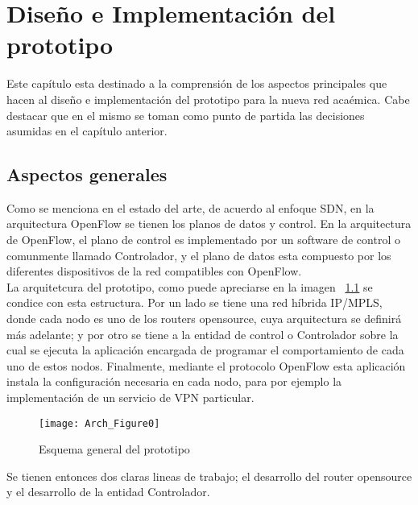 \chapter{Dise\~no e Implementaci\'on del prototipo}

\ifpdf
    \graphicspath{{Chapter4/Figs/Raster/}{Chapter4/Figs/PDF/}{Chapter4/Figs/}}
\else
    \graphicspath{{Chapter4/Figs/Vector/}{Chapter4/Figs/}}
\fi

Este cap\'itulo esta destinado a la comprensi\'on de los aspectos principales que hacen al dise\~no e implementaci\'on del prototipo para la nueva red aca\'emica. Cabe destacar que en el mismo se toman como punto de partida las decisiones asumidas en el cap\'itulo anterior.

\section{Aspectos generales}

Como se menciona en el estado del arte, de acuerdo al enfoque SDN, en la arquitectura OpenFlow se tienen los planos de datos y control. En la arquitectura de OpenFlow, el plano de control es implementado por un software de control o comunmente llamado Controlador, y el plano de datos esta compuesto por los diferentes dispositivos de la red compatibles con OpenFlow.\\

La arquitetcura del prototipo, como puede apreciarse en la imagen ~\ref{fig:OpenSourceRArch0} se condice con esta estructura. Por un lado se tiene una red h\'ibrida IP/MPLS, donde cada nodo es uno de los routers opensource, cuya arquitectura se definir\'a m\'as adelante; y por otro se tiene a la entidad de control o Controlador sobre la cual se ejecuta la aplicaci\'on encargada de programar el comportamiento de cada uno de estos nodos. Finalmente, mediante el protocolo OpenFlow esta aplicaci\'on instala la configuraci\'on necesaria en cada nodo, para por ejemplo la implementaci\'on de un servicio de VPN particular.\\

\newpage
\begin{figure}[htbp!] 
\centering    
\texttt{[image: Arch\_Figure0]}
\caption[OpenSourceRArch0]{Esquema general del prototipo}
\label{fig:OpenSourceRArch0}
\end{figure}

Se tienen entonces dos claras lineas de trabajo; el desarrollo del router opensource y el desarrollo de la entidad Controlador. 

